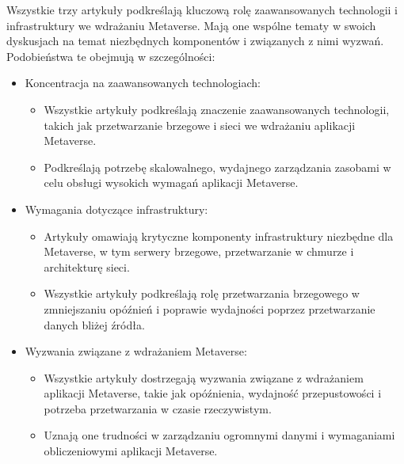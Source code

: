 Wszystkie trzy artykuły podkreślają kluczową rolę zaawansowanych technologii i infrastruktury we wdrażaniu Metaverse. Mają one wspólne tematy w swoich dyskusjach na temat niezbędnych komponentów i związanych z nimi wyzwań. Podobieństwa te obejmują w szczególności:
\begin{itemize}
    \item Koncentracja na zaawansowanych technologiach:
    \begin{itemize}
        \item Wszystkie artykuły podkreślają znaczenie zaawansowanych technologii, takich jak przetwarzanie brzegowe i sieci  we wdrażaniu aplikacji Metaverse.
        \item Podkreślają potrzebę skalowalnego, wydajnego zarządzania zasobami w celu obsługi wysokich wymagań aplikacji Metaverse.
    \end{itemize}
    \item Wymagania dotyczące infrastruktury:
    \begin{itemize}
        \item Artykuły omawiają krytyczne komponenty infrastruktury niezbędne dla Metaverse, w tym serwery brzegowe, przetwarzanie w chmurze i architekturę sieci.
        \item Wszystkie artykuły podkreślają rolę przetwarzania brzegowego w zmniejszaniu opóźnień i poprawie wydajności poprzez przetwarzanie danych bliżej źródła.
    \end{itemize}
    \item Wyzwania związane z wdrażaniem Metaverse:
    \begin{itemize}
        \item Wszystkie artykuły dostrzegają wyzwania związane z wdrażaniem aplikacji Metaverse, takie jak opóźnienia, wydajność przepustowości i potrzeba przetwarzania w czasie rzeczywistym.
        \item Uznają one trudności w zarządzaniu ogromnymi danymi i wymaganiami obliczeniowymi aplikacji Metaverse.
    \end{itemize}
\end{itemize}

